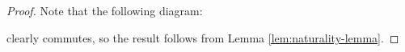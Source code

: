 \begin{proof}
  Note that the following diagram:
  \begin{center}
  \end{center}
  clearly commutes, so the result follows from
  Lemma \ref{lem:naturality-lemma}.
\end{proof}
